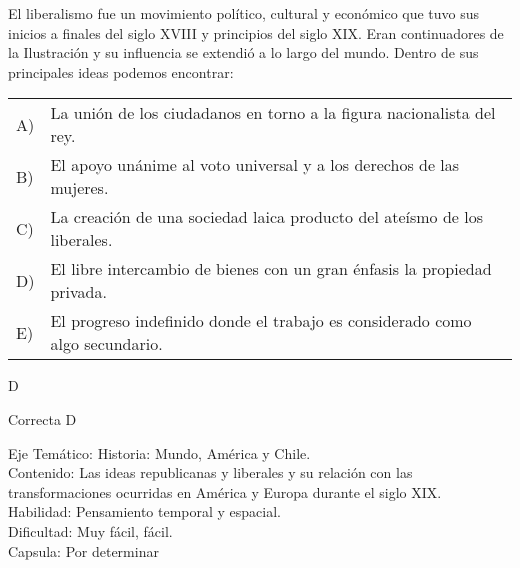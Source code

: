 \documentclass[letterpaper,11pt]{article}
\newcommand{\anchopregunta}{0.9\textwidth}
\begin{document}
\begin{enumerate}
\begin{minipage}{\anchopregunta}
\item El liberalismo fue un movimiento político, cultural y económico que tuvo sus inicios a finales del siglo XVIII y principios del siglo XIX. Eran continuadores de la Ilustración y su influencia se extendió a lo largo del mundo. Dentro de sus principales ideas podemos encontrar:
\begin{flushleft}\begin{tabular}{@{\hspace{-.001\textwidth}}l@{\hspace{2pt}}p{}}
A)& La unión de los ciudadanos en torno a la figura nacionalista del rey.\\
B)& El apoyo unánime al voto universal y a los derechos de las mujeres.\\
C)& La creación de una sociedad laica producto del ateísmo de los liberales.\\
D)& El libre intercambio de bienes con un gran énfasis la propiedad privada.\\
E)& El progreso indefinido donde el trabajo es considerado como algo secundario.\\ 
\end{tabular}\end{flushleft}%
\begin{key} D
\end{key} 
\begin{hint}
\end{hint}
\begin{answer} Correcta D \\
\end{answer}
\begin{info} %
\begin{flushleft}
Eje Temático: Historia: Mundo, América y Chile.\\
Contenido: Las ideas republicanas y liberales y su relación con las transformaciones ocurridas en América y Europa durante el siglo XIX.\\
Habilidad: Pensamiento temporal y espacial.\\
Dificultad: Muy fácil, fácil.\\
Capsula: Por determinar \\
\end{flushleft} 
\end{info}
\end{minipage}\vfill$\;$ %


\end{enumerate}
\end{document}
